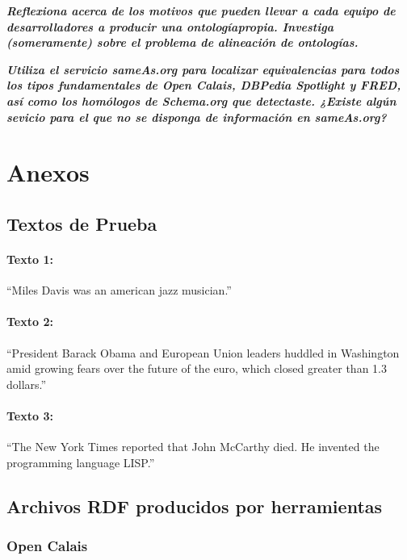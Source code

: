 \documentclass[spanish]{llncs}   %
\begin{document}
\textbf{\textit{Reflexiona acerca de los motivos que pueden llevar a cada equipo de desarrolladores a producir una ontologíapropia. 
Investiga (someramente) sobre el problema de alineación de ontologías.}}

\textbf{\textit{Utiliza el servicio sameAs.org para localizar equivalencias para todos los tipos fundamentales de Open Calais, DBPedia 
Spotlight y FRED, así como los homólogos de Schema.org que detectaste. ¿Existe algún sevicio para el que no se disponga de información 
en sameAs.org?}}

\section{Anexos}

\subsection{Textos de Prueba}\label{Textos}

\paragraph{Texto 1:}
“Miles Davis was an american jazz musician.”

\paragraph{Texto 2:}
“President Barack Obama and European Union leaders huddled in Washington amid growing fears over the future of the euro, which closed greater than 1.3 dollars.”

\paragraph{Texto 3:}
“The New York Times reported that John McCarthy died. He invented the programming language LISP.”

\subsection{Archivos RDF producidos por herramientas}

\subsubsection{Open Calais}\label{OpenCalaisRDF}
%
%
%
\end{document}
